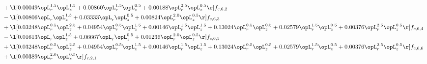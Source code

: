 \begin{alignat}{2}
& + \l[  0.00049 \opL_r^{1.5} \opL_z^{1.5} +  0.00860 \opL_r^{1.5} \opL_z^{0.5} +  0.00188 \opL_r^{2.5} \opL_z^{0.5}  \r] f_{c,6,2} \nonumber \\ 
& - \l[  0.00806 \opL_r \opL_z^{1.5} +  0.03333 \opL_r \opL_z^{0.5} +  0.00824 \opL_r^{2.0} \opL_z^{0.5}  \r] f_{c,6,3} \nonumber \\ 
& + \l[  0.03248 \opL_r^{0.5} \opL_z^{2.5} +  0.04954 \opL_r^{0.5} \opL_z^{1.5} +  0.00146 \opL_r^{1.5} \opL_z^{1.5} +  0.13024 \opL_r^{0.5} \opL_z^{0.5} +  0.02579 \opL_r^{1.5} \opL_z^{0.5} +  0.00376 \opL_r^{2.5} \opL_z^{0.5}  \r] f_{c,6,4} \nonumber \\ 
& - \l[  0.01613 \opL_r \opL_z^{1.5} +  0.06667 \opL_r \opL_z^{0.5} +  0.01236 \opL_r^{2.0} \opL_z^{0.5}  \r] f_{c,6,5} \nonumber \\ 
& + \l[  0.03248 \opL_r^{0.5} \opL_z^{2.5} +  0.04954 \opL_r^{0.5} \opL_z^{1.5} +  0.00146 \opL_r^{1.5} \opL_z^{1.5} +  0.13024 \opL_r^{0.5} \opL_z^{0.5} +  0.02579 \opL_r^{1.5} \opL_z^{0.5} +  0.00376 \opL_r^{2.5} \opL_z^{0.5}  \r] f_{c,6,6} \nonumber \\ 
& + \l[  0.00389 \opL_r^{2.0} \opL_z^{0.5}  \r] f_{c,2,1} \nonumber \\ 
\end{alignat} 


